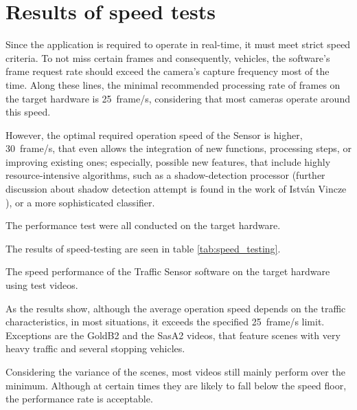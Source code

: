 \section{Results of speed tests}\label{sec:speed_tests}
Since the application is required to operate in real-time, it must meet strict speed criteria.
To not miss certain frames and consequently, vehicles, the software's frame request rate should exceed the camera's capture frequency most of the time.
Along these lines, the minimal recommended processing rate of frames on the target hardware is \SI{25}{frame/s}, considering that most cameras operate around this speed.

However, the optimal required operation speed of the Sensor is higher, \SI{30}{frame/s}, that even allows the integration of new functions, processing steps, or improving existing ones; especially, possible new features, that include highly resource-intensive algorithms, such as a shadow-detection processor (further discussion about shadow detection attempt is found in the work of Istv{\'a}n Vincze \cite{Vincze2016}), or a more sophisticated classifier.

The performance test were all conducted on the target hardware.

The results of speed-testing are seen in table \ref{tab:speed_testing}.

\begin{table}[htbp]
	\centering
	\begin{adjustbox}{center}
	\end{adjustbox}
	\caption{The speed performance of the Traffic Sensor software on the target hardware using test videos.}
	\label{tab:speed_testing}%
\end{table}%

As the results show, although the average operation speed depends on the traffic characteristics, in most situations, it exceeds the specified \SI{25}{frame/s} limit.
Exceptions are the GoldB2 and the SasA2 videos, that feature scenes with very heavy traffic and several stopping vehicles.

Considering the variance of the scenes, most videos still mainly perform over the minimum.
Although at certain times they are likely to fall below the speed floor, the performance rate is acceptable.
